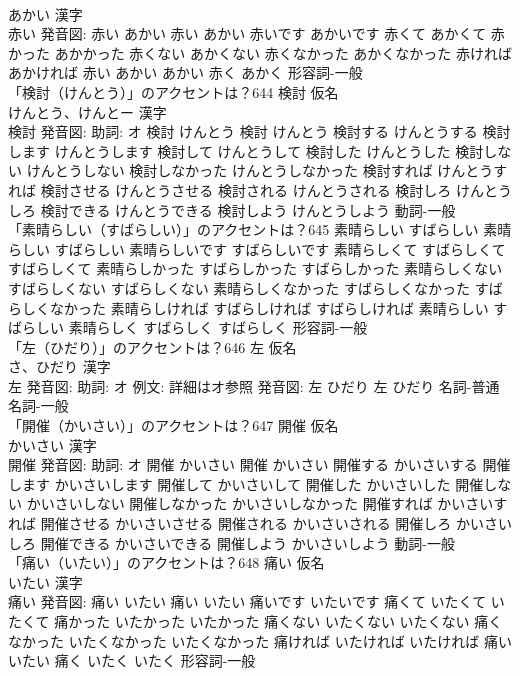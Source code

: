 \documentclass[8pt]{extreport}
\begin{document}
\begin{CJK}{UTF8}{min}
\\	あかい 漢字　
\\	赤い 発音図:	赤い あかい		赤い あかい 赤いです あかいです 赤くて あかくて 赤かった あかかった 赤くない あかくない 赤くなかった あかくなかった 赤ければ あかければ 赤い あかい あかい 赤く あかく				形容詞-一般 
\\	「検討（けんとう）」のアクセントは？644	検討 仮名　
\\	けんとう、けんとー 漢字　
\\	検討 発音図: 助詞: オ	検討 けんとう		検討 けんとう 検討する けんとうする 検討します けんとうします 検討して けんとうして 検討した けんとうした 検討しない けんとうしない 検討しなかった けんとうしなかった 検討すれば けんとうすれば 検討させる けんとうさせる 検討される けんとうされる 検討しろ けんとうしろ 検討できる けんとうできる 検討しよう けんとうしよう				動詞-一般 
\\	「素晴らしい（すばらしい）」のアクセントは？645		素晴らしい すばらしい		素晴らしい すばらしい 素晴らしいです すばらしいです 素晴らしくて すばらしくて すばらしくて 素晴らしかった すばらしかった すばらしかった 素晴らしくない すばらしくない すばらしくない 素晴らしくなかった すばらしくなかった すばらしくなかった 素晴らしければ すばらしければ すばらしければ 素晴らしい すばらしい 素晴らしく すばらしく すばらしく				形容詞-一般 
\\	「左（ひだり）」のアクセントは？646	左 仮名　
\\	さ、ひだり 漢字　
\\	左 発音図: 助詞: オ 例文: 詳細はオ参照 発音図:	左 ひだり		左 ひだり				名詞-普通名詞-一般 
\\	「開催（かいさい）」のアクセントは？647	開催 仮名　
\\	かいさい 漢字　
\\	開催 発音図: 助詞: オ	開催 かいさい		開催 かいさい 開催する かいさいする 開催します かいさいします 開催して かいさいして 開催した かいさいした 開催しない かいさいしない 開催しなかった かいさいしなかった 開催すれば かいさいすれば 開催させる かいさいさせる 開催される かいさいされる 開催しろ かいさいしろ 開催できる かいさいできる 開催しよう かいさいしよう				動詞-一般 
\\	「痛い（いたい）」のアクセントは？648	痛い 仮名　
\\	いたい 漢字　
\\	痛い 発音図:	痛い いたい		痛い いたい 痛いです いたいです 痛くて いたくて いたくて 痛かった いたかった いたかった 痛くない いたくない いたくない 痛くなかった いたくなかった いたくなかった 痛ければ いたければ いたければ 痛い いたい 痛く いたく いたく				形容詞-一般 

\end{CJK}
\end{document}
